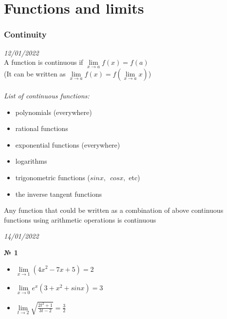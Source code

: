 \documentclass[12pt]{article}
\newenvironment{task}[1][0]{\vspace{.5cm} {\textbf{№ #1} \vspace{.5cm}\\ }\large}{}
\begin{document}
\part{Functions and limits}
\section{Continuity}
{\hfill \textit{12/01/2022}\vspace{.5cm}\\}
A function is continuous if $\lim\limits_{x \to a} f(x) = f(a)$\\
(It can be written as $\lim\limits_{x \to a} f(x) = f(\lim\limits_{x \to a} x)$)\\\\
\large{\textit{List of continuous functions:}}
\begin{itemize}
	\item polynomials (everywhere)
	\item rational functions
	\item exponential functions (everywhere)
	\item logarithms
	\item trigonometric functions ($sinx, \enspace cosx,$ etc)
	\item the inverse tangent functions
\end{itemize}
Any function that could be written as a combination of above continuous functions using arithmetic operations is continuous

\newpage
{\hfill \textit{14/01/2022}\vspace{.5cm}\\}

\begin{task}[1]
\begin{itemize}
	\item {$\lim\limits_{x \to 1} (4x^2-7x+5) = 2$	
}
\item{
$\lim\limits_{x \to 0} e^x(3+x^2+sinx) = 3$
}
\item{
$\lim\limits_{t \to 2} \sqrt{\frac{2t^2+1}{3t-2}}= \frac{3}{2}$
}
\end{itemize}
\end{task}
\end{document}
